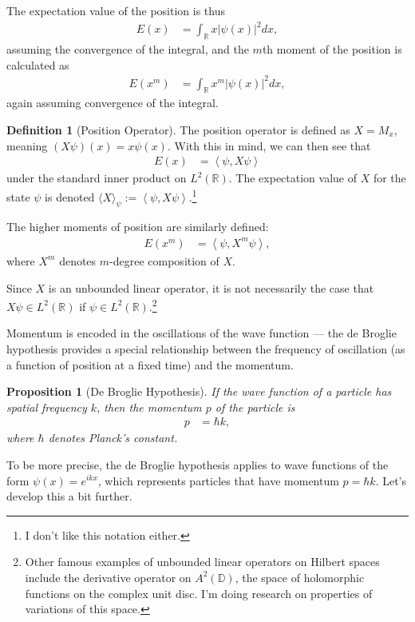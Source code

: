 \documentclass[10pt]{extarticle}
\newcommand{\R}{\mathbb{R}}
\newcommand{\iprod}[2]{\left\langle #1,#2\right\rangle}
\theoremstyle{plain}
\newtheorem*{proposition}{Proposition}%
\theoremstyle{definition}
\newtheorem*{definition}{Definition}
\theoremstyle{remark}
\renewcommand{\newline}{\hfill\break}
\begin{document}
  The expectation value of the position is thus
  \begin{align*}
    E(x) &= \int_{\R}x\left\vert \psi(x) \right\vert^2dx,
  \end{align*}
  assuming the convergence of the integral, and the $m$th moment of the position is calculated as
  \begin{align*}
    E(x^m) &= \int_{\R}x^m\left\vert \psi(x) \right\vert^2dx,
  \end{align*}
  again assuming convergence of the integral.
  \begin{definition}[Position Operator]
    The position operator is defined as $X = M_{x}$, meaning $(X\psi)(x) = x\psi(x)$. With this in mind, we can then see that
    \begin{align*}
      E(x) &= \iprod{\psi}{X\psi}
    \end{align*}
    under the standard inner product on $L^{2}(\R)$. The expectation value of $X$ for the state $\psi$ is denoted $\langle X \rangle_{\psi} := \iprod{\psi}{X\psi}$.\footnote{I don't like this notation either.}\newline

    The higher moments of position are similarly defined:
    \begin{align*}
      E(x^m) &= \iprod{\psi}{X^{m}\psi},
    \end{align*}
    where $X^{m}$ denotes $m$-degree composition of $X$.\newline

    Since $X$ is an unbounded linear operator, it is not necessarily the case that $X\psi \in L^{2}(\R)$ if $\psi\in L^{2}(\R)$.\footnote{Other famous examples of unbounded linear operators on Hilbert spaces include the derivative operator on $A^{2}(\mathbb{D})$, the space of holomorphic functions on the complex unit disc. I'm doing research on properties of variations of this space.}
  \end{definition}
  Momentum is encoded in the oscillations of the wave function --- the de Broglie hypothesis provides a special relationship between the frequency of oscillation (as a function of position at a fixed time) and the momentum.
  \begin{proposition}[De Broglie Hypothesis]
    If the wave function of a particle has spatial frequency $k$, then the momentum $p$ of the particle is
    \begin{align*}
      p &= \hbar k,
    \end{align*}
    where $\hbar$ denotes Planck's constant.
  \end{proposition}
  To be more precise, the de Broglie hypothesis applies to wave functions of the form $\psi(x) = e^{ikx}$, which represents particles that have momentum $p = \hbar k$. Let's develop this a bit further.\newline
\end{document}
